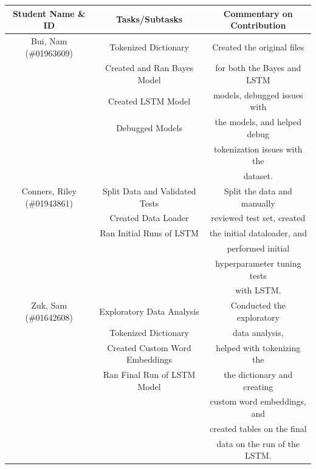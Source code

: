 \documentclass[11pt]{article}
\begin{document}
\begin{table}[H]
    \centering
    \begin{tabular}{c|c|c}
        \hline
        Student Name \& ID          & Tasks/Subtasks                 & Commentary on Contribution   \\
        \hline
        Bui, Nam (\#01963609)       & Tokenized Dictionary           & Created the original files   \\
                                    & Created and Ran Bayes Model    & for both the Bayes and LSTM  \\
                                    & Created LSTM Model             & models, debugged issues with \\
                                    & Debugged Models                & the models, and helped debug \\
                                    &                                & tokenization issues with the \\
                                    &                                & dataset.                     \\
        \hline
        Conners, Riley (\#01943861) & Split Data and Validated Tests & Split the data and manually  \\
                                    & Created Data Loader            & reviewed test set, created   \\
                                    & Ran Initial Runs of LSTM       & the initial dataloader, and  \\
                                    &                                & performed initial            \\
                                    &                                & hyperparameter tuning tests  \\
                                    &                                & with LSTM.                   \\
        \hline
        Zuk, Sam (\#01642608)       & Exploratory Data Analysis      & Conducted the exploratory    \\
                                    & Tokenized Dictionary           & data analysis,               \\
                                    & Created Custom Word Embeddings & helped with tokenizing the   \\
                                    & Ran Final Run of LSTM Model    & the dictionary and creating  \\
                                    &                                & custom word embeddings, and  \\
                                    &                                & created tables on the final  \\
                                    &                                & data on the run of the LSTM. \\
        \hline
    \end{tabular}
    \label{tab:my_label}
\end{table}




\end{document}
